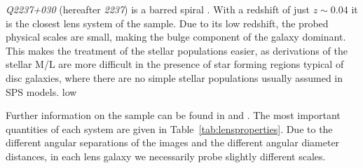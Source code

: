 \documentclass[useAMS,usenatbib]{mn2e}
\begin{document}
\textit{Q2237+030} (hereafter \textit{2237}) is a barred spiral \citep{1988AJ.....95.1331Y}. With a redshift of just $z\sim0.04$ it is the closest lens system of the sample. Due to its low redshift, the probed physical scales are small, making the bulge component of the galaxy dominant. This makes the treatment of the stellar populations easier, as derivations of the stellar M/L are more difficult in the presence of star forming regions typical of disc galaxies, where there are no simple stellar populations usually assumed in SPS models.
low

Further information on the sample can be found in \citet{2011ApJ...740...97L} and \citet{2012A&A...538A..99S}. The most important quantities of each system are given in Table~\ref{tab:lensproperties}. Due to the different angular separations of the images and the different angular diameter distances, in each lens galaxy we necessarily probe slightly different scales.
\end{document}

